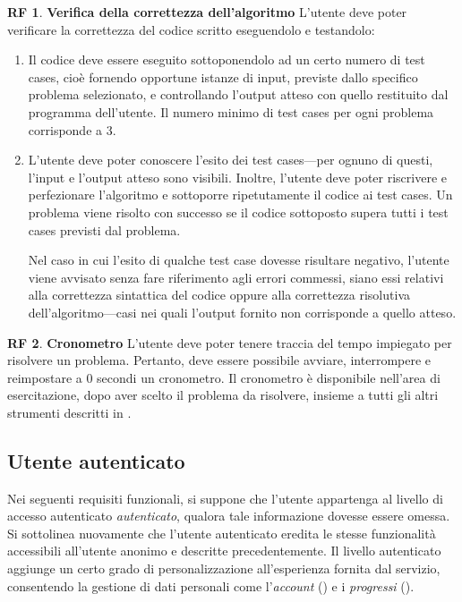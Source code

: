 \documentclass[11pt, a4paper]{article}
\theoremstyle{definition}
\newtheorem{funcreq}{RF} %
\begin{document}
\begin{funcreq}
\label{test}
\textbf{Verifica della correttezza dell'algoritmo }
L'utente deve poter verificare la correttezza del codice scritto eseguendolo
e testandolo:
\begin{enumerate}
    \item Il codice deve essere eseguito sottoponendolo ad un certo numero
    di test cases, cioè fornendo opportune istanze di input, previste dallo
    specifico problema selezionato, e controllando l'output atteso con quello
    restituito dal programma dell'utente.
    Il numero minimo di test cases per ogni problema corrisponde a 3.

    \item L'utente deve poter conoscere l'esito dei test cases—per ognuno
    di questi, l'input e l'output atteso sono visibili. Inoltre, l'utente
    deve poter riscrivere e perfezionare l'algoritmo e sottoporre ripetutamente
    il codice ai test cases. Un problema viene risolto con successo se
    il codice sottoposto supera tutti i test cases previsti dal problema.

    Nel caso in cui l'esito di qualche test case dovesse risultare negativo, l'utente
    viene avvisato senza fare riferimento agli errori commessi, siano essi
    relativi alla correttezza sintattica del codice oppure alla
    correttezza risolutiva dell'algoritmo—casi nei quali l'output fornito
    non corrisponde a quello atteso.
\end{enumerate}
\end{funcreq}

\begin{funcreq}
    \label{chrono}
    \textbf{Cronometro }
    L'utente deve poter tenere traccia del tempo impiegato per risolvere un problema.
    Pertanto, deve essere possibile avviare, interrompere e reimpostare a 0 secondi un
    cronometro. Il cronometro è disponibile nell'area di esercitazione, dopo aver scelto
    il problema da risolvere, insieme a tutti gli altri strumenti descritti in
    \textcolor{blue}{}.
\end{funcreq}

\newpage
\begin{center}
    \section*{Utente autenticato}
\end{center}

Nei seguenti requisiti funzionali, si suppone che l'utente appartenga al livello
di accesso autenticato \textit{autenticato}, qualora tale informazione dovesse essere omessa.
Si sottolinea nuovamente che l'utente autenticato eredita le stesse funzionalità
accessibili all'utente anonimo e descritte precedentemente.
Il livello autenticato aggiunge un certo grado di personalizzazione all'esperienza
fornita dal servizio, consentendo la gestione di dati personali come
l'\textit{account} (\textcolor{blue}{}) e i
\textit{progressi} (\textcolor{blue}{}).
\\
\end{document}
